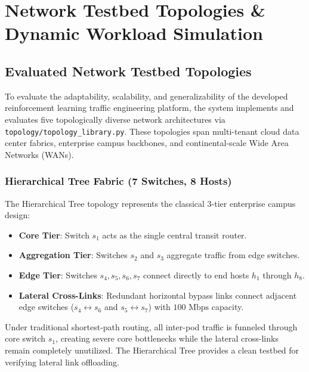 \documentclass[12pt,a4paper,oneside]{report}
\begin{document}

\chapter{Network Testbed Topologies \& Dynamic Workload Simulation}
\label{chap:topologies}

\section{Evaluated Network Testbed Topologies}
To evaluate the adaptability, scalability, and generalizability of the developed reinforcement learning traffic engineering platform, the system implements and evaluates five topologically diverse network architectures via \texttt{topology/topology\_library.py}. These topologies span multi-tenant cloud data center fabrics, enterprise campus backbones, and continental-scale Wide Area Networks (WANs).

\subsection{Hierarchical Tree Fabric (7 Switches, 8 Hosts)}
The Hierarchical Tree topology represents the classical 3-tier enterprise campus design:
\begin{itemize}
    \item \textbf{Core Tier}: Switch $s_1$ acts as the single central transit router.
    \item \textbf{Aggregation Tier}: Switches $s_2$ and $s_3$ aggregate traffic from edge switches.
    \item \textbf{Edge Tier}: Switches $s_4, s_5, s_6, s_7$ connect directly to end hosts $h_1$ through $h_8$.
    \item \textbf{Lateral Cross-Links}: Redundant horizontal bypass links connect adjacent edge switches ($s_4 \leftrightarrow s_6$ and $s_5 \leftrightarrow s_7$) with $100\text{ Mbps}$ capacity.
\end{itemize}
Under traditional shortest-path routing, all inter-pod traffic is funneled through core switch $s_1$, creating severe core bottlenecks while the lateral cross-links remain completely unutilized. The Hierarchical Tree provides a clean testbed for verifying lateral link offloading.
\end{document}
